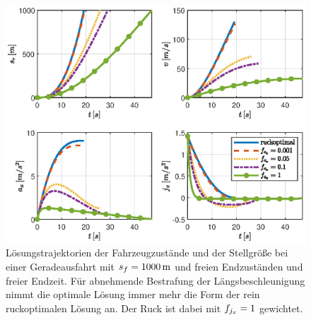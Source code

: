 \begin{figure}[h] 
	\centering
	\includegraphics[width=0.8\linewidth]{./Bilder/Ergebnisse/Geradeausfahrt/var_fax.eps}
	\caption{Lösungstrajektorien der Fahrzeugzustände und der Stellgröße bei einer Geradeausfahrt mit $s_f=1000\,\mathrm{m}$ und freien Endzuständen und freier Endzeit. Für abnehmende Bestrafung der Längsbeschleunigung nimmt die optimale Lösung immer mehr die Form der rein ruckoptimalen Lösung an. Der Ruck ist dabei mit $f_{j_x} = 1$ gewichtet.}
	\label{fig:var_fax}
\end{figure}

